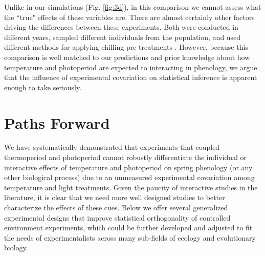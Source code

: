 \documentclass[11pt]{article}
\begin{document}
Unlike in our simulations (Fig. \ref{fig:3d}), in this comparison we cannot assess what the ``true" effects of these variables are. There are almost certainly other factors driving the differences between these experiments. Both were conducted in different years, sampled different individuals from the population, and used different methods for applying chilling pre-treatments \citep{Flynn2018,Buonaiuto:2021ug}. However, because this comparison is well matched to our predictions and prior knowledge about how temperature and photoperiod are expected to interacting in phenology, we argue that the influence of experimental covariation on statistical inference is apparent enough to take seriously.\\

\section*{Paths Forward}
We have systematically demonstrated that experiments that coupled thermoperiod and photoperiod cannot robustly differentiate the individual or interactive effects of temperature and photoperiod on spring phenology (or any other biological process) due to an unmeasured experimental covariation among temperature and light treatments. Given the paucity of interactive studies in the literature, it is clear that we need more well designed studies to better characterize the effects of these cues. Below we offer several generalized experimental designs that improve statistical orthogonality of controlled environment experiments, which could be further developed and adjusted to fit the needs of experimentalists across many sub-fields of ecology and evolutionary biology. 
\end{document}
